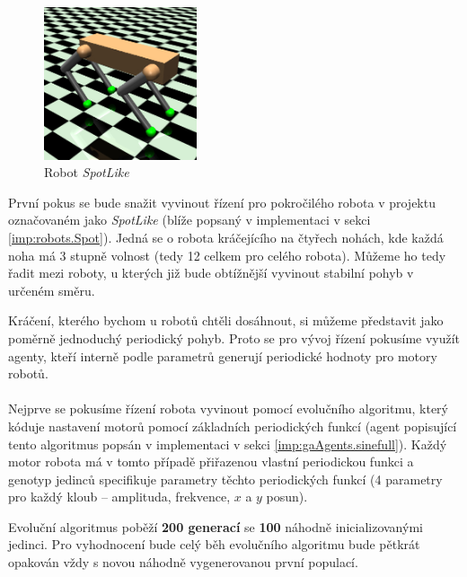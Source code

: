 \begin{figure}[!htb]
    \centering
    \includegraphics[width=0.4\textwidth]{../img/crop_SpotLike.jpg}
    \caption{Robot \emph{SpotLike}}
    \label{fig:robot:spotlike}
\end{figure}

První pokus se bude snažit vyvinout řízení pro pokročilého robota v projektu
označovaném jako \emph{SpotLike} (blíže popsaný v implementaci v sekci
\ref{imp:robots.Spot}). Jedná se o robota kráčejícího na čtyřech nohách, kde každá
noha má 3 stupně volnost (tedy 12 celkem pro celého robota). Můžeme ho tedy
řadit mezi roboty, u kterých již bude obtížnější vyvinout stabilní pohyb v
určeném směru.

Kráčení, kterého bychom u robotů chtěli dosáhnout, si můžeme představit jako
poměrně jednoduchý periodický pohyb. Proto se pro vývoj řízení pokusíme využít
agenty, kteří interně podle parametrů generují periodické hodnoty pro motory
robotů. 

\paragraph{}
Nejprve se pokusíme řízení robota vyvinout pomocí evolučního
algoritmu, který kóduje nastavení motorů pomocí základních periodických funkcí
(agent popisující tento algoritmus popsán v implementaci v sekci
\ref{imp:gaAgents.sinefull}). Každý motor robota má v tomto případě přiřazenou vlastní
periodickou funkci a genotyp jedinců specifikuje parametry těchto periodických
funkcí (4 parametry pro každý kloub -- amplituda, frekvence, $x$ a $y$ posun).

Evoluční algoritmus poběží \textbf{200 generací} se \textbf{100} náhodně
inicializovanými jedinci. Pro vyhodnocení bude celý běh evolučního algoritmu
bude pětkrát opakován vždy s novou náhodně vygenerovanou první populací.

